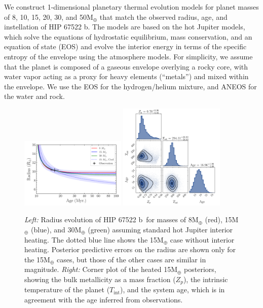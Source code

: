 \documentclass[twocolumn]{aastex63} %
\newcommand{\plname}{HIP 67522 b}
\begin{document}
We construct 1-dimensional planetary thermal evolution models for planet masses of 8, 10, 15, 20, 30, and 50M$_{\oplus}$ that match the observed radius, age, and instellation of \plname. The models are based on the \citet{Thorngren2018} hot Jupiter models, which solve the equations of hydrostatic equilibrium, mass conservation, and an equation of state (EOS) and evolve the interior energy in terms of the specific entropy of the envelope using the \citet{Fortney2007} atmosphere models. For simplicity, we assume that the planet is composed of a gaseous envelope overlying a rocky core, with water vapor acting as a proxy for heavy elements (``metals'') and mixed within the envelope. We use the \citet{Chabrier2019} EOS for the hydrogen/helium mixture, and ANEOS \citep{Thompson1990} for the water and rock. 

\begin{figure}[ht]
    \centering
    \includegraphics[width=0.45\textwidth]{radiusEvolution.pdf}
    \includegraphics[width=0.45\textwidth]{corner15.pdf}   
    \caption{\textit{Left:} Radius evolution of \plname\ for masses of 8M$_{\oplus}$ (red), 15M$_{\oplus}$ (blue), and 30M$_{\oplus}$ (green) assuming standard hot Jupiter interior heating. The dotted blue line shows the 15M$_{\oplus}$ case without interior heating. Posterior predictive errors on the radius are shown only for the 15M$_{\oplus}$ cases, but those of the other cases are similar in magnitude. \textit{Right: } Corner plot of the heated 15M$_{\oplus}$ posteriors, showing the bulk metallicity as a mass fraction ($Z_p$), the intrinsic temperature of the planet ($T_\mathrm{int}$), and the system age, which is in agreement with the age inferred from observations.
    \label{fig:radius_evolution}}
\end{figure} 
\end{document}

